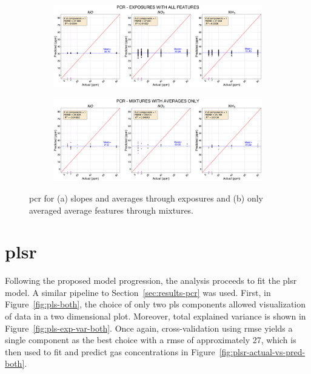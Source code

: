 \begin{figure}[!htb]
	\centering
	
	\begin{subfigure}[t]{1\textwidth}
		\includegraphics[width=1\linewidth]{../figures/pcr-act-vs-pred.png}
		\caption{}
		\label{fig:pcr-act-vs-pred} 
	\end{subfigure}
	
	\begin{subfigure}[t]{1\textwidth}
		\includegraphics[width=1\linewidth]{../figures/pcr-act-vs-pred-avg-feat.png}
		\caption{}
		\label{fig:pcr-act-vs-pred-avg-feat}
	\end{subfigure}
	
	\caption{\acrshort{pcr} for (a) slopes and averages through exposures and (b) only averaged average features through mixtures.}
	\label{fig:pcr-both}
\end{figure}

\clearpage
\section{\acrlong{plsr}}
\label{sec:results-plsr}

Following the proposed model progression, the analysis proceeds to fit the \acrshort{plsr} model. A similar pipeline to Section~\ref{sec:results-pcr} was used. First, in Figure~\ref{fig:pls-both}, the choice of only two \acrshort{pls} components allowed visualization of data in a two dimensional plot. Moreover, total explained variance is shown in Figure~\ref{fig:pls-exp-var-both}. Once again, cross-validation using \acrshort{rmse} yields a single component as the best choice with a \acrshort{rmse} of approximately 27, which is then used to fit and predict gas concentrations in Figure~\ref{fig:plsr-actual-vs-pred-both}.

